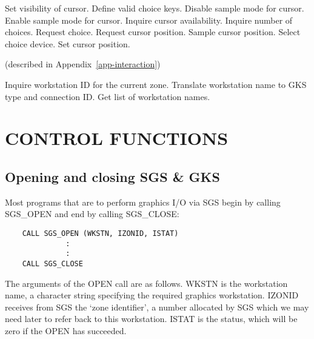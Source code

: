 \begin{routinelist}
   Set visibility of cursor.
   Define valid choice keys.
   Disable sample mode for cursor.
   Enable sample mode for cursor.
   Inquire cursor availability.
   Inquire number of choices.
   Request choice.
   Request cursor position.
   Sample cursor position.
   Select choice device.
   Set cursor position.
\end{routinelist}

 (described in Appendix~\ref{app-interaction})
\begin{routinelist}
   Inquire workstation ID for the current zone.
   Translate workstation name to GKS type and connection ID.
   Get list of workstation names.
\end{routinelist}
                                         
\section {CONTROL FUNCTIONS}\label{sec-control}

\subsection {Opening and closing SGS \& GKS}\label{sec-op-cl}

Most programs that are to perform graphics I/O via SGS begin by calling
SGS\_OPEN and end by calling SGS\_CLOSE:
\begin{verbatim}                                                  
    CALL SGS_OPEN (WKSTN, IZONID, ISTAT)
              :
              :
    CALL SGS_CLOSE
\end{verbatim}
The arguments of the OPEN call are as follows.
WKSTN is the workstation name, a character string specifying the required
graphics workstation.
IZONID receives from SGS the `zone identifier', a number allocated by SGS which
we may need later to refer back to this workstation.
ISTAT is the status, which will be zero if the OPEN has succeeded.

